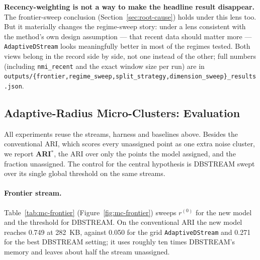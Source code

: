 \documentclass[11pt]{article}
\begin{document}
\textbf{Recency-weighting is not a way to make the headline result disappear.} The frontier-sweep conclusion (Section~\ref{sec:root-cause}) holds under this lens too. But it materially changes the regime-sweep story: under a lens consistent with the method's own design assumption — that recent data should matter more — \texttt{AdaptiveDStream} looks meaningfully better in most of the regimes tested. Both views belong in the record side by side, not one instead of the other; full numbers (including \texttt{nmi\_recent} and the exact window size per run) are in \texttt{outputs/\{frontier,regime\_sweep,split\_strategy,dimension\_sweep\}\_results.json}.

\subsection{Adaptive-Radius Micro-Clusters: Evaluation}
\label{sec:mc-results}

All experiments reuse the streams, harness and baselines above. Besides the conventional ARI, which scores every unassigned point as one extra noise cluster, we report \textbf{ARI$^*$}, the ARI over only the points the model assigned, and the fraction unassigned. The control for the central hypothesis is DBSTREAM swept over its single global threshold on the same streams.

\paragraph{Frontier stream.} Table~\ref{tab:mc-frontier} (Figure~\ref{fig:mc-frontier}) sweeps $r^{(0)}$ for the new model and the threshold for DBSTREAM. On the conventional ARI the new model reaches 0.749 at 282~KB, against 0.050 for the grid \texttt{AdaptiveDStream} and 0.271 for the best DBSTREAM setting; it uses roughly ten times DBSTREAM's memory and leaves about half the stream unassigned.
\end{document}
